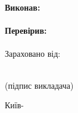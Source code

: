 \begin{titlepage}
    \vfill

    \begin{minipage}{\textwidth}
        \hfill
        \begin{minipage}{0.4\textwidth}
            \Large

            \textbf{Виконав:} \\
            \STUDENT \\
            \textbf{Перевірив:} \\
            \TEACHER \\

            Зараховано від:
            \hrulefill \\
            \begin{center}
                \small
                \hrulefill \\
                (підпис викладача)
            \end{center}
        \end{minipage}
    \end{minipage}

    \vfill

    \begin{center}
        \LARGE
        Київ-\the\year{}
    \end{center}
\end{titlepage}
